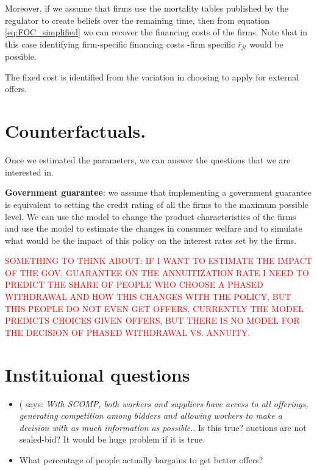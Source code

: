 \documentclass[12pt]{article}
\theoremstyle{plain}
\theoremstyle{plain}
\begin{document}
Moreover, if we assume that firms use the mortality tables published by the regulator to create beliefs over the remaining time, then from equation \ref{eq:FOC_simplified} we can recover the financing costs of the firms. Note that in this case identifying firm-specific financing costs -firm specific $\bar{r}_{jt}$ would be possible. 

The fixed cost is identified from the variation in choosing to apply for external offers. 






\section{Counterfactuals.}

Once we estimated the parameters, we can answer the questions that we are interested in. 

\textbf{Government guarantee}: we assume that implementing a government guarantee is equivalent to setting the credit rating of all the firms to the maximum possible level. We can use the model to change the product characteristics of the firms and use the model to estimate the changes in consumer welfare and to simulate what would be the impact of this policy on the interest rates set by the firms. 

\textcolor{red}{SOMETHING TO THINK ABOUT: IF I WANT TO ESTIMATE THE IMPACT OF THE GOV. GUARANTEE ON THE ANNUITIZATION RATE I NEED TO PREDICT THE SHARE OF PEOPLE WHO CHOOSE A PHASED WITHDRAWAL AND HOW THIS CHANGES WITH THE POLICY, BUT THIS PEOPLE DO NOT EVEN GET OFFERS, CURRENTLY THE MODEL PREDICTS CHOICES GIVEN OFFERS, BUT THERE IS NO MODEL FOR THE DECISION OF PHASED WITHDRAWAL VS. ANNUITY.  }

\section{Instituional questions}

\begin{itemize}
    \item (\textcite[p. 391]{morales_chilean_2017} says: \textit{With SCOMP, both workers and suppliers have access to all offerings, generating competition among bidders and allowing workers to make a decision with as much information as possible.}. Is this true? auctions are not sealed-bid? It would be huge problem if it is true.  

    \item What percentage of people actually bargains to get better offers? 
    
\end{itemize}
\end{document}
